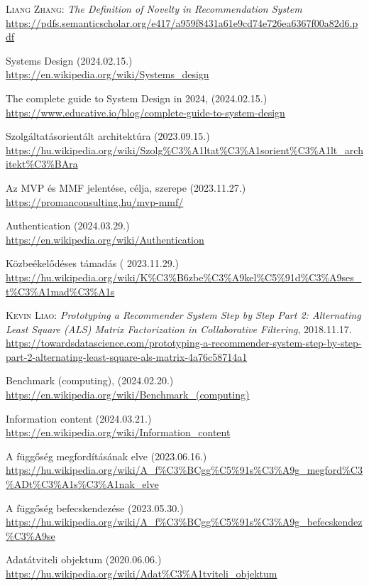 \documentclass[
]{thesis-ekf}
\theoremstyle{definition}
\theoremstyle{remark}
\begin{document}
\begin{thebibliography}{2}
\textsc{Liang Zhang}: \emph{The Definition of Novelty in Recommendation System}
\\\url{https://pdfs.semanticscholar.org/e417/a959f8431a61e9cd74e726ea6367f00a82d6.pdf}

Systems Design (2024.02.15.)
\\\url{https://en.wikipedia.org/wiki/Systems_design}

The complete guide to System Design in 2024, (2024.02.15.)
\\\url{https://www.educative.io/blog/complete-guide-to-system-design}

Szolgáltatásorientált architektúra (2023.09.15.)
\\\url{https://hu.wikipedia.org/wiki/Szolg%C3%A1ltat%C3%A1sorient%C3%A1lt_architekt%C3%BAra}

Az MVP és MMF jelentése, célja, szerepe (2023.11.27.)
\\\url{https://promanconsulting.hu/mvp-mmf/}

Authentication (2024.03.29.)
\\\url{https://en.wikipedia.org/wiki/Authentication}

Közbeékelődéses támadás ( 2023.11.29.)
\\\url{https://hu.wikipedia.org/wiki/K%C3%B6zbe%C3%A9kel%C5%91d%C3%A9ses_t%C3%A1mad%C3%A1s}

\textsc{Kevin Liao}: \emph{Prototyping a Recommender System Step by Step Part 2: Alternating Least Square (ALS) Matrix Factorization in Collaborative Filtering}, 2018.11.17.
\\\url{https://towardsdatascience.com/prototyping-a-recommender-system-step-by-step-part-2-alternating-least-square-als-matrix-4a76c58714a1}

Benchmark (computing), (2024.02.20.)
\\\url{https://en.wikipedia.org/wiki/Benchmark_(computing)}

Information content (2024.03.21.)
\\\url{https://en.wikipedia.org/wiki/Information_content}

A függőség megfordításának elve (2023.06.16.)
\\\url{https://hu.wikipedia.org/wiki/A_f%C3%BCgg%C5%91s%C3%A9g_megford%C3%ADt%C3%A1s%C3%A1nak_elve}

A függőség befecskendezése (2023.05.30.)
\\\url{https://hu.wikipedia.org/wiki/A_f%C3%BCgg%C5%91s%C3%A9g_befecskendez%C3%A9se}

Adatátviteli objektum (2020.06.06.)
\\\url{https://hu.wikipedia.org/wiki/Adat%C3%A1tviteli_objektum}
\end{thebibliography}


\end{document}
